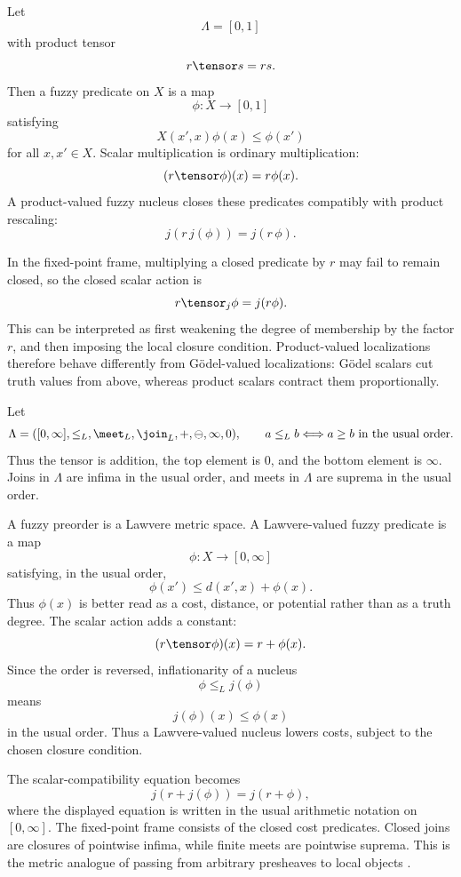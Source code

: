 \begin{example}
\label{ex:product-valued-localizations}
Let
\[
    \Lambda=[0,1]
\]
with product tensor
\[
    r\tensor s=rs.
\]
Then a fuzzy predicate on \(X\) is a map
\[
    \phi:X\to[0,1]
\]
satisfying
\[
    X(x',x)\phi(x)\leq \phi(x')
\]
for all \(x,x'\in X\). Scalar multiplication is ordinary multiplication:
\[
    (r\tensor\phi)(x)=r\phi(x).
\]
A product-valued fuzzy nucleus closes these predicates compatibly with product
rescaling:
\[
    j(r\,j(\phi))=j(r\,\phi).
\]

In the fixed-point frame, multiplying a closed predicate by \(r\) may fail to remain
closed, so the closed scalar action is
\[
    r\tensor_j\phi=j(r\phi).
\]
This can be interpreted as first weakening the degree of membership by the factor
\(r\), and then imposing the local closure condition. Product-valued localizations
therefore behave differently from G\"odel-valued localizations: G\"odel scalars cut
truth values from above, whereas product scalars contract them proportionally.
\end{example}

\begin{example}
\label{ex:lawvere-valued-localizations}
Let
\[
    \Lambda=
    ([0,\infty],\leq_L,\meet_L,\join_L,+,\ominus,\infty,0),
    \qquad
    a\leq_L b
    \Longleftrightarrow
    a\geq b
    \text{ in the usual order}.
\]
Thus the tensor is addition, the top element is \(0\), and the bottom element is
\(\infty\). Joins in \(\Lambda\) are infima in the usual order, and meets in
\(\Lambda\) are suprema in the usual order.

A fuzzy preorder is a Lawvere metric space. A Lawvere-valued fuzzy predicate is a map
\[
    \phi:X\to[0,\infty]
\]
satisfying, in the usual order,
\[
    \phi(x')\leq d(x',x)+\phi(x).
\]
Thus \(\phi(x)\) is better read as a cost, distance, or potential rather than as a
truth degree. The scalar action adds a constant:
\[
    (r\tensor\phi)(x)=r+\phi(x).
\]
Since the order is reversed, inflationarity of a nucleus
\[
    \phi\leq_L j(\phi)
\]
means
\[
    j(\phi)(x)\leq \phi(x)
\]
in the usual order. Thus a Lawvere-valued nucleus lowers costs, subject to the chosen
closure condition.

The scalar-compatibility equation becomes
\[
    j(r+j(\phi))=j(r+\phi),
\]
where the displayed equation is written in the usual arithmetic notation on
\([0,\infty]\). The fixed-point frame consists of the closed cost predicates. Closed
joins are closures of pointwise infima, while finite meets are pointwise suprema.
This is the metric analogue of passing from arbitrary presheaves to local objects
\cite{Lawvere1973MetricSpaces}.
\end{example}


